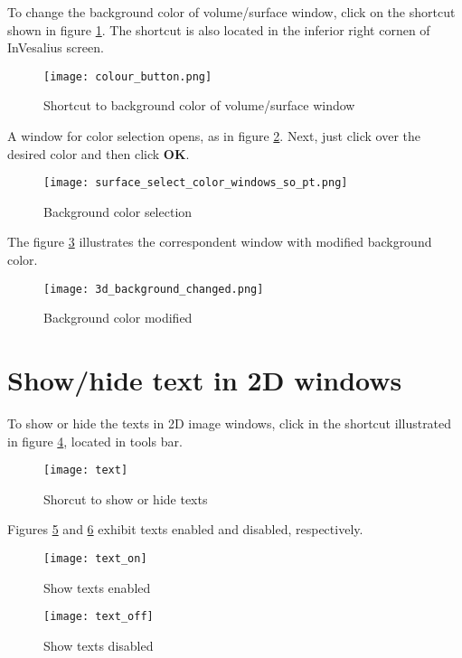 To change the background color of volume/surface window, click on the shortcut shown in figure
\ref{fig:button_select_color_2}. The shortcut is also located in the inferior right cornen of InVesalius screen.

\begin{figure}[!htb]
\centering
\texttt{[image: colour\_button.png]}
\caption{Shortcut to background color of volume/surface window}
\label{fig:button_select_color_2}
\end{figure}

A window for color selection opens, as in figure \ref{fig:color_window_background}.
Next, just click over the desired color and then click \textbf{OK}.

\begin{figure}[!htb]
\centering
\texttt{[image: surface\_select\_color\_windows\_so\_pt.png]}
\caption{Background color selection}
\label{fig:color_window_background}
\end{figure}

The figure \ref{fig:background_color} illustrates the correspondent window with modified background color.

\begin{figure}[!htb]
\centering
\texttt{[image: 3d\_background\_changed.png]}
\caption{Background color modified}
\label{fig:background_color}
\end{figure}

\newpage

\section{Show/hide text in 2D windows}

To show or hide the texts in 2D image windows, click in the shortcut illustrated
in figure \ref{fig:text}, located in tools bar.

\begin{figure}[!htb]
\centering
\texttt{[image: text]}
\caption{Shorcut to show or hide texts}
\label{fig:text}
\end{figure}

Figures \ref{fig:text_on} and \ref{fig:text_off} exhibit texts enabled and disabled, respectively.

\begin{figure}[!htb]
\centering
\texttt{[image: text\_on]}
\caption{Show texts enabled}
\label{fig:text_on}
\end{figure}

\begin{figure}[!htb]
\centering
\texttt{[image: text\_off]}
\caption{Show texts disabled}
\label{fig:text_off}
\end{figure}
